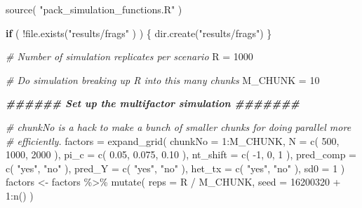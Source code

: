 \documentclass[
]{book}
\newenvironment{Shaded}{\begin{snugshade}}{\end{snugshade}}
\newcommand{\AttributeTok}[1]{\textcolor[rgb]{0.77,0.63,0.00}{#1}}
\newcommand{\CommentTok}[1]{\textcolor[rgb]{0.56,0.35,0.01}{\textit{#1}}}
\newcommand{\ControlFlowTok}[1]{\textcolor[rgb]{0.13,0.29,0.53}{\textbf{#1}}}
\newcommand{\DecValTok}[1]{\textcolor[rgb]{0.00,0.00,0.81}{#1}}
\newcommand{\DocumentationTok}[1]{\textcolor[rgb]{0.56,0.35,0.01}{\textbf{\textit{#1}}}}
\newcommand{\FloatTok}[1]{\textcolor[rgb]{0.00,0.00,0.81}{#1}}
\newcommand{\FunctionTok}[1]{\textcolor[rgb]{0.00,0.00,0.00}{#1}}
\newcommand{\NormalTok}[1]{#1}
\newcommand{\OtherTok}[1]{\textcolor[rgb]{0.56,0.35,0.01}{#1}}
\newcommand{\SpecialCharTok}[1]{\textcolor[rgb]{0.00,0.00,0.00}{#1}}
\newcommand{\StringTok}[1]{\textcolor[rgb]{0.31,0.60,0.02}{#1}}
\begin{document}
\begin{Shaded}
\begin{Highlighting}[]
\FunctionTok{source}\NormalTok{( }\StringTok{"pack\_simulation\_functions.R"}\NormalTok{ )}

\ControlFlowTok{if}\NormalTok{ ( }\SpecialCharTok{!}\FunctionTok{file.exists}\NormalTok{(}\StringTok{"results/frags"}\NormalTok{ ) ) \{}
    \FunctionTok{dir.create}\NormalTok{(}\StringTok{"results/frags"}\NormalTok{)}
\NormalTok{\}}

\CommentTok{\# Number of simulation replicates per scenario}
\NormalTok{R }\OtherTok{=} \DecValTok{1000}

\CommentTok{\# Do simulation breaking up R into this many chunks}
\NormalTok{M\_CHUNK }\OtherTok{=} \DecValTok{10}

\DocumentationTok{\#\#\#\#\#\# Set up the multifactor simulation \#\#\#\#\#\#\#}

\CommentTok{\# chunkNo is a hack to make a bunch of smaller chunks for doing parallel more}
\CommentTok{\# efficiently.}
\NormalTok{factors }\OtherTok{=} \FunctionTok{expand\_grid}\NormalTok{( }\AttributeTok{chunkNo =} \DecValTok{1}\SpecialCharTok{:}\NormalTok{M\_CHUNK,}
                       \AttributeTok{N =} \FunctionTok{c}\NormalTok{( }\DecValTok{500}\NormalTok{, }\DecValTok{1000}\NormalTok{, }\DecValTok{2000}\NormalTok{ ),}
                       \AttributeTok{pi\_c =} \FunctionTok{c}\NormalTok{( }\FloatTok{0.05}\NormalTok{, }\FloatTok{0.075}\NormalTok{, }\FloatTok{0.10}\NormalTok{ ),}
                       \AttributeTok{nt\_shift =} \FunctionTok{c}\NormalTok{( }\SpecialCharTok{{-}}\DecValTok{1}\NormalTok{, }\DecValTok{0}\NormalTok{, }\DecValTok{1}\NormalTok{ ),}
                       \AttributeTok{pred\_comp =} \FunctionTok{c}\NormalTok{( }\StringTok{"yes"}\NormalTok{, }\StringTok{"no"}\NormalTok{ ),}
                       \AttributeTok{pred\_Y =} \FunctionTok{c}\NormalTok{( }\StringTok{"yes"}\NormalTok{, }\StringTok{"no"}\NormalTok{ ),}
                       \AttributeTok{het\_tx =} \FunctionTok{c}\NormalTok{( }\StringTok{"yes"}\NormalTok{, }\StringTok{"no"}\NormalTok{ ),}
                       \AttributeTok{sd0 =} \DecValTok{1}
\NormalTok{                       )}
\NormalTok{factors }\OtherTok{\textless{}{-}}\NormalTok{ factors }\SpecialCharTok{\%\textgreater{}\%} \FunctionTok{mutate}\NormalTok{(}
    \AttributeTok{reps =}\NormalTok{ R }\SpecialCharTok{/}\NormalTok{ M\_CHUNK,}
    \AttributeTok{seed =} \DecValTok{16200320} \SpecialCharTok{+} \DecValTok{1}\SpecialCharTok{:}\FunctionTok{n}\NormalTok{()}
\NormalTok{)}
\end{Highlighting}
\end{Shaded}
\end{document}
